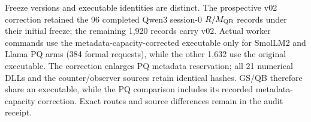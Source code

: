 Freeze versions and executable identities are distinct. The prospective v02 correction retained the 96 completed Qwen3 session-0 $R/M_{\mathrm{QB}}$ records under their initial freeze; the remaining 1,920 records carry v02. Actual worker commands use the metadata-capacity-corrected executable only for SmolLM2 and Llama PQ arms (384 formal requests), while the other 1,632 use the original executable. The correction enlarges PQ metadata reservation; all 21 numerical DLLs and the counter/observer sources retain identical hashes. GS/QB therefore share an executable, while the PQ comparison includes its recorded metadata-capacity correction. Exact routes and source differences remain in the audit receipt.
